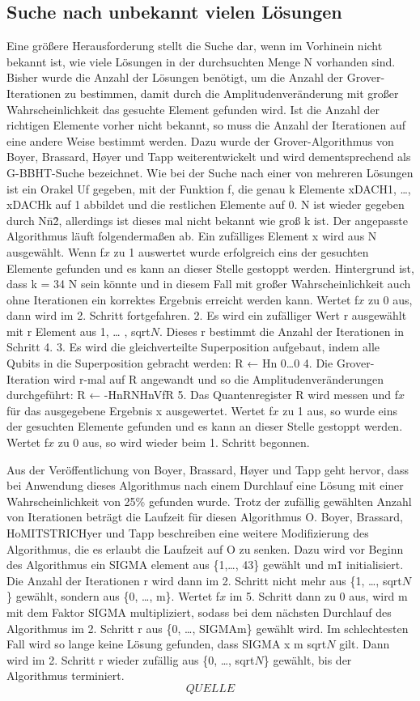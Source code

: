 \subsection{Suche nach unbekannt vielen Lösungen}
Eine größere Herausforderung stellt die Suche dar, wenn im Vorhinein nicht bekannt ist, wie viele Lösungen in der durchsuchten Menge N vorhanden sind. Bisher wurde die Anzahl der Lösungen benötigt, um die Anzahl der Grover-Iterationen zu bestimmen, damit durch die Amplitudenveränderung mit großer Wahrscheinlichkeit das gesuchte Element gefunden wird. Ist die Anzahl der richtigen Elemente vorher nicht bekannt, so muss die Anzahl der Iterationen auf eine andere Weise bestimmt werden. Dazu wurde der Grover-Algorithmus von Boyer, Brassard, Høyer und Tapp weiterentwickelt und wird dementsprechend als G-BBHT-Suche bezeichnet.
Wie bei der Suche nach einer von mehreren Lösungen ist ein Orakel Uf gegeben, mit der Funktion f, die genau k Elemente xDACH1, …, xDACHk auf 1 abbildet und die restlichen Elemente auf 0. N ist wieder gegeben durch N\=n\^2, allerdings ist dieses mal nicht bekannt wie groß k ist. Der angepasste Algorithmus läuft folgendermaßen ab. Ein zufälliges Element x wird aus N ausgewählt. Wenn f\(x\) zu 1 auswertet wurde erfolgreich eins der gesuchten Elemente gefunden und es kann an dieser Stelle gestoppt werden. Hintergrund ist, dass k \>= 3\/4 N sein könnte und in diesem Fall mit großer Wahrscheinlichkeit auch ohne Iterationen ein korrektes Ergebnis erreicht werden kann. Wertet f\(x\) zu 0 aus, dann wird im 2. Schritt fortgefahren.
2. Es wird ein zufälliger Wert r ausgewählt mit r Element aus 1, … , sqrt\(N\). Dieses r bestimmt die Anzahl der Iterationen in Schritt 4.
3. Es wird die gleichverteilte Superposition aufgebaut, indem alle Qubits in die Superposition gebracht werden:
R ← Hn 0…0
4. Die Grover-Iteration wird r-mal auf R angewandt und so die Amplitudenveränderungen durchgeführt:
R ← -HnRNHnVfR
5. Das Quantenregister R wird messen und f\(x\) für das ausgegebene Ergebnis x ausgewertet. Wertet f\(x\) zu 1 aus, so wurde eins der gesuchten Elemente gefunden und es kann an dieser Stelle gestoppt werden. Wertet f\(x\) zu 0 aus, so wird wieder beim 1. Schritt begonnen.

Aus der Veröffentlichung von Boyer, Brassard, Høyer und Tapp geht hervor, dass bei Anwendung dieses Algorithmus nach einem Durchlauf eine Lösung mit einer Wahrscheinlichkeit von 25\% gefunden wurde. Trotz der zufällig gewählten Anzahl von Iterationen beträgt die Laufzeit für diesen Algorithmus O.
Boyer, Brassard, HoMITSTRICHyer und Tapp beschreiben eine weitere Modifizierung des Algorithmus, die es erlaubt die Laufzeit auf O zu senken. 
Dazu wird vor Beginn des Algorithmus ein SIGMA element aus \{1,…, 4\/3\} gewählt und m\=1 initialisiert. Die Anzahl der Iterationen r wird dann im 2. Schritt nicht mehr aus \{1, …, sqrt\(N\)\} gewählt, sondern aus \{0, …, m\}. Wertet f\(x\) im 5. Schritt dann zu 0 aus, wird m mit dem Faktor SIGMA multipliziert, sodass bei dem nächsten Durchlauf des Algorithmus im 2. Schritt r aus \{0, …, SIGMAm\} gewählt wird. Im schlechtesten Fall wird so lange keine Lösung gefunden, dass SIGMA x m \> sqrt\(N\) gilt. Dann wird im 2. Schritt r wieder zufällig aus \{0,  …, sqrt\(N\)\} gewählt, bis der Algorithmus terminiert. \[QUELLE\]


